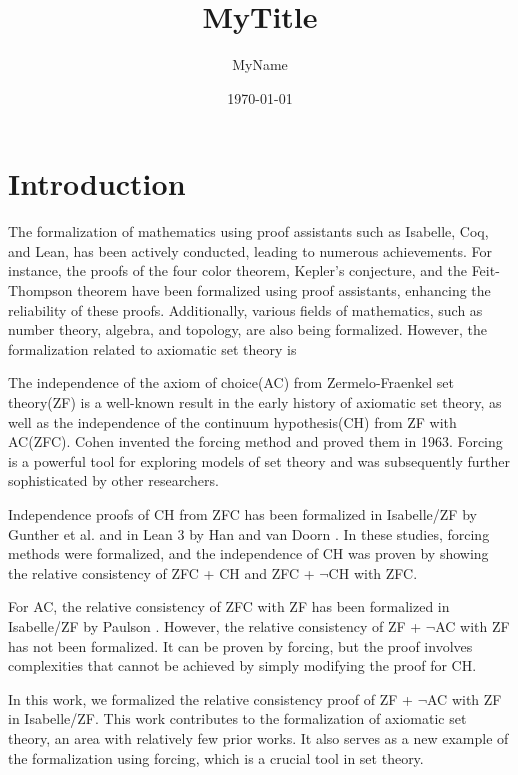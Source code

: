 \documentclass{report}
\begin{document}
\title{MyTitle}
\author{MyName}
\date{\today}
\maketitle


\clearpage
\tableofcontents
\clearpage
\chapter{Introduction}

The formalization of mathematics using proof assistants such as Isabelle, Coq, and Lean, has been actively conducted, leading to numerous achievements. 
For instance, the proofs of the four color theorem, Kepler's conjecture, and the Feit-Thompson theorem have been formalized using proof assistants, enhancing the reliability of these proofs. 
Additionally, various fields of mathematics, such as number theory, algebra, and topology, are also being formalized.
However, the formalization related to axiomatic set theory is

The independence of the axiom of choice(AC) from Zermelo-Fraenkel set theory(ZF) is a well-known result in the early history of axiomatic set theory,
as well as the independence of the continuum hypothesis(CH) from ZF with AC(ZFC).
Cohen invented the forcing method and proved them in 1963.
Forcing is a powerful tool for exploring models of set theory and was subsequently further sophisticated by other researchers.

Independence proofs of CH from ZFC has been formalized in Isabelle/ZF by Gunther et al. \cite{gunther_independence} and in Lean 3 by Han and van Doorn \cite{flypitch}.
In these studies, forcing methods were formalized, and the independence of CH was proven by 
showing the relative consistency of ZFC + CH and ZFC + $\neg$CH with ZFC.

For AC, the relative consistency of ZFC with ZF has been formalized in Isabelle/ZF by Paulson \cite{paulson_AC}.
However, the relative consistency of ZF + $\neg$AC with ZF has not been formalized.
It can be proven by forcing, but the proof involves complexities that cannot be achieved by simply modifying the proof for CH.

In this work, we formalized the relative consistency proof of ZF + $\neg$AC with ZF in Isabelle/ZF. 
This work contributes to the formalization of axiomatic set theory, an area with relatively few prior works.
It also serves as a new example of the formalization using forcing, which is a crucial tool in set theory.
\end{document}
